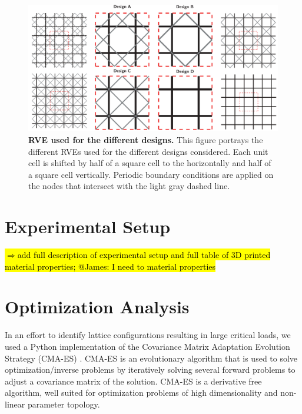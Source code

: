 \documentclass[10pt,twoside]{fernandes_supp}
\newcommand{\mf}[1]{\noindent\color{color2}\sethlcolor{cyan}\hl{$\Longrightarrow$#1}\normalcolor}
\begin{document}



\begin{figure}
    \centering
	\includegraphics[width=0.9\linewidth]{SFig10.pdf}
	\caption{{\bf RVE used for the different designs.} This figure portrays the different RVEs used for the different designs considered. Each unit cell is shifted by half of a square cell to the horizontally and half of a square cell  vertically. Periodic boundary conditions are applied on the nodes that intersect with the light gray dashed line.}
	\label{RVE}
\end{figure}

\section{Experimental Setup}
\mf{add full description of experimental setup and full table of 3D printed material properties; @James: I need to material properties}

\section{Optimization Analysis}
In an effort to identify lattice configurations resulting in large critical loads, we used a Python implementation of the Covariance Matrix Adaptation Evolution Strategy (CMA-ES) \citep{hansen2003}. CMA-ES is an evolutionary algorithm that is used to solve optimization/inverse problems by iteratively solving several forward problems to adjust a covariance matrix of the solution. CMA-ES is a derivative free algorithm, well suited for optimization problems of high dimensionality and non-linear parameter topology.
\end{document}
